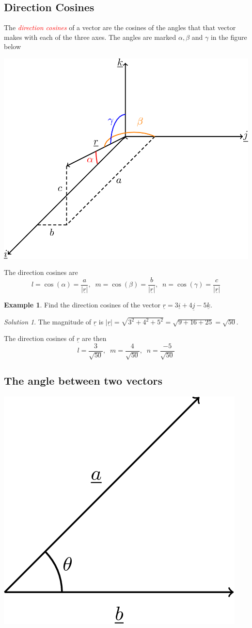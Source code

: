 \documentclass[
  11pt,
  oneside]{book}
\newcommand{\slide}{}
\theoremstyle{definition}
\theoremstyle{definition}
\newtheorem{example}{Example}[chapter]
\theoremstyle{definition}
\theoremstyle{definition}
\theoremstyle{remark}
\newtheorem*{solution}{Solution}
\begin{document}
\slide

\subsection{Direction Cosines}\label{direction-cosines}

The \textcolor{red}{\em direction cosines} of a vector are the cosines of the angles that that vector makes with each of
the three axes. The angles are marked \(\alpha, \beta\) and \(\gamma\) in the figure below

\begin{center}\includegraphics[width=0.35\linewidth]{tikztopng-figure61} \end{center}

The direction cosines are
\[
l = \cos(\alpha) = \frac{a}{|\underline r|},\;\;m = \cos(\beta) = \frac{b}{|\underline r|},\;\;n = \cos(\gamma) = \frac{c}{|\underline r|}
\]
\slide

\begin{example}
Find the direction cosines of the vector \(\underline r = 3\underline i + 4\underline j - 5\underline k\).
\end{example}

\begin{solution}
The magnitude of \(\underline r\) is \(|\underline r| = \sqrt{3^2+4^2+5^2} = \sqrt{9+16+25} = \sqrt{50}\).

The direction cosines of \(\underline r\) are then
\[
l = \frac{3}{\sqrt{50}},\;\;m = \frac{4}{\sqrt{50}},\;\;n = \frac{-5}{\sqrt{50}}
\]
\end{solution}

\slide

\subsection{The angle between two vectors}\label{the-angle-between-two-vectors}

\begin{center}\includegraphics[width=0.25\linewidth]{tikztopng-figure62} \end{center}
\end{document}
